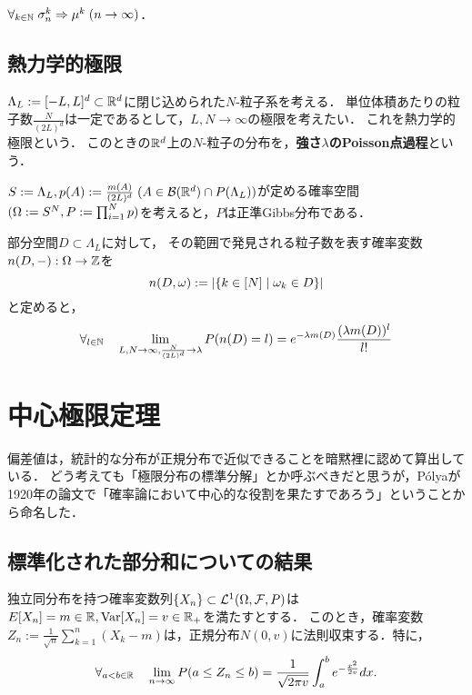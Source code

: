 \documentclass[uplatex,dvipdfmx]{jsreport}
\begin{document}
\begin{theorem}
    $\forall_{k\in\mathbb{N}}\;\sigma^k_n\Rightarrow\mu^k\;(n\to\infty)$．
\end{theorem}

\subsection{熱力学的極限}

\begin{notation}
    $\Lambda_L:=[-L,L]^d\subset\mathbb{R}^d$に閉じ込められた$N$-粒子系を考える．
    単位体積あたりの粒子数$\frac{N}{(2L)^d}$は一定であるとして，$L,N\to\infty$の極限を考えたい．
    これを熱力学的極限という．
    このときの$\mathbb{R}^d$上の$N$-粒子の分布を，\textbf{強さ$\lambda$のPoisson点過程}という．

    $S:=\Lambda_L,p(A):=\frac{m(A)}{(2L)^d}\;(A\in\mathcal{B}(\mathbb{R}^d)\cap P(\Lambda_L))$が定める確率空間$(\Omega:=S^N,P:=\prod_{i=1}^Np)$を考えると，$P$は正準Gibbs分布である．
\end{notation}

\begin{theorem}
    部分空間$D\subset\Lambda_L$に対して，
    その範囲で発見される粒子数を表す確率変数$n(D,-):\Omega\to\mathbb{Z}$を
    \[n(D,\omega):=\left|\left\{k\in[N]\mid\omega_k\in D\right\}\right|\]
    と定めると，
    \[\forall_{l\in\mathbb{N}}\quad\lim_{L,N\to\infty,\frac{N}{(2L)^d}\to\lambda}P(n(D)=l)=e^{-\lambda m(D)}\frac{(\lambda m(D))^l}{l!}\]
\end{theorem}

\section{中心極限定理}

\begin{tcolorbox}[colframe=ForestGreen, colback=ForestGreen!10!white,breakable,colbacktitle=ForestGreen!40!white,coltitle=black,fonttitle=\bfseries\sffamily,
title=]
    偏差値は，統計的な分布が正規分布で近似できることを暗黙裡に認めて算出している．
    どう考えても「極限分布の標準分解」とか呼ぶべきだと思うが，Pólyaが1920年の論文で「確率論において中心的な役割を果たすであろう」ということから命名した．
\end{tcolorbox}

\subsection{標準化された部分和についての結果}

\begin{theorem}
    独立同分布を持つ確率変数列$\{X_n\}\subset\mathcal{L}^1(\Omega,\mathcal{F},P)$は$E[X_n]=m\in\mathbb{R},\mathrm{Var}[X_n]=v\in\mathbb{R}_+$を満たすとする．
    このとき，確率変数$Z_n:=\frac{1}{\sqrt{n}}\sum^n_{k=1}(X_k-m)$は，正規分布$N(0,v)$に法則収束する．特に，
    \[\forall_{a<b\in\mathbb{R}}\quad\lim_{n\to\infty}P(a\le Z_n\le b)=\frac{1}{\sqrt{2\pi v}}\int^b_ae^{-\frac{x^2}{2v}}dx.\]
\end{theorem}
\end{document}
